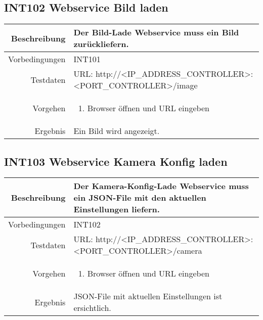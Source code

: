\subsection{INT102 Webservice Bild laden}
\begin{table}[h!]
	\renewcommand{\arraystretch}{1.5}
	\begin{tabular}{|r|p{14cm}|}
		\hline Beschreibung & Der Bild-Lade Webservice muss ein Bild zurückliefern. \\ 
		\hline Vorbedingungen & INT101 \\ 
		\hline Testdaten & URL: http://<IP_ADDRESS_CONTROLLER>:<PORT_CONTROLLER>/image \\ 
		\hline Vorgehen & 
		\begin{enumerate}
			\item Browser öffnen und URL eingeben
		\end{enumerate} \\ 
		\hline Ergebnis & Ein Bild wird angezeigt. \\ 
		\hline 
	\end{tabular}
\end{table}

\subsection{INT103 Webservice Kamera Konfig laden}
\begin{table}[h!]
	\renewcommand{\arraystretch}{1.5}
	\begin{tabular}{|r|p{14cm}|}
		\hline Beschreibung & Der Kamera-Konfig-Lade Webservice muss ein JSON-File mit den aktuellen Einstellungen liefern. \\ 
		\hline Vorbedingungen & INT102 \\ 
		\hline Testdaten & URL: http://<IP_ADDRESS_CONTROLLER>:<PORT_CONTROLLER>/camera \\ 
		\hline Vorgehen & 
		\begin{enumerate}
			\item Browser öffnen und URL eingeben
		\end{enumerate} \\ 
		\hline Ergebnis & JSON-File mit aktuellen Einstellungen ist ersichtlich. \\ 
		\hline 
	\end{tabular}
\end{table}

